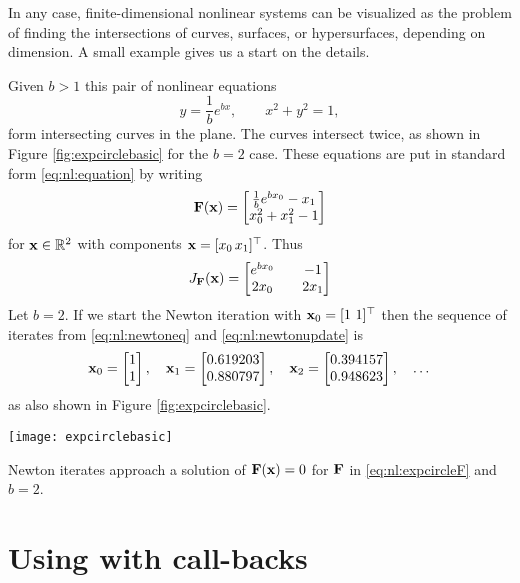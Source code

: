 In any case, finite-dimensional nonlinear systems can be visualized as the problem of finding the intersections of curves, surfaces, or hypersurfaces, depending on dimension.  A small example gives us a start on the details.

\clearpage
\noindent\hrulefill
\begin{example}  Given $b > 1$ this pair of nonlinear equations
    $$y = \frac{1}{b} e^{bx}, \qquad x^2+y^2 = 1,$$
form intersecting curves in the plane.  The curves intersect twice, as shown in Figure \ref{fig:expcirclebasic} for the $b=2$ case.  These equations are put in standard form \eqref{eq:nl:equation} by writing
\begin{equation}
\label{eq:nl:expcircleF}
\mathbf{F}(\mathbf{x}) = \begin{bmatrix}
           \frac{1}{b} e^{b x_0} - x_1 \\
           x_0^2 + x_1^2 - 1
           \end{bmatrix}
\end{equation}
for $\mathbf{x}\in \mathbb{R}^2$ with components $\mathbf{x} = [x_0 \, x_1]^\top$.  Thus
\begin{equation}
\label{eq:nl:ecjacobian}
J_{\mathbf{F}}(\mathbf{x}) = \begin{bmatrix}
    e^{b x_0} & & -1 \\
    2 x_0   & & 2 x_1 \end{bmatrix}
\end{equation}
Let $b=2$.  If we start the Newton iteration with $\mathbf{x}_0 = [1 \,\, 1]^\top$ then the sequence of iterates from \eqref{eq:nl:newtoneq} and \eqref{eq:nl:newtonupdate} is
    $${\mathbf{x}}_{0} = \begin{bmatrix} 1 \\ 1 \end{bmatrix}, \quad {\mathbf{x}}_{1} = \begin{bmatrix} 0.619203 \\ 0.880797 \end{bmatrix}, \quad {\mathbf{x}}_{2} = \begin{bmatrix} 0.394157 \\ 0.948623 \end{bmatrix}, \quad \dots$$
as also shown in Figure \ref{fig:expcirclebasic}.

\begin{marginfigure}
\texttt{[image: expcirclebasic]}
\caption{Newton iterates approach a solution of $\mathbf{F}(\mathbf{x})=0$ for $\mathbf{F}$ in \eqref{eq:nl:expcircleF} and $b=2$.}
\label{fig:expcirclebasic}
\end{marginfigure}

\noindent\hrulefill
\end{example}


\section{Using \pSNES with call-backs} \label{sec:usingsnes}

